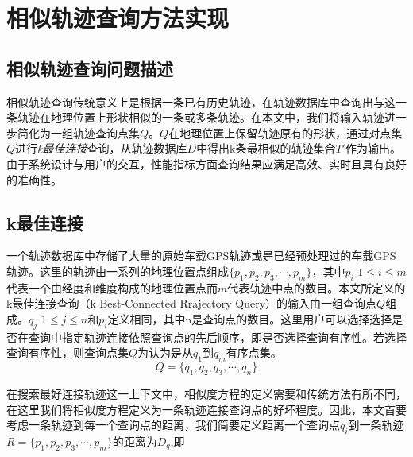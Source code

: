

\theoremstyle{definition}
\newtheorem{definition}{定义}[section]

\chapter{相似轨迹查询方法实现}
\label{chap:implementation}

\section{相似轨迹查询问题描述}
\label{sec:question describe}
相似轨迹查询传统意义上是根据一条已有历史轨迹，在轨迹数据库中查询出与这一条轨迹在地理位置上形状相似的一条或多条轨迹。在本文中，我们将输入轨迹进一步简化为一组轨迹查询点集$Q$。$Q$在地理位置上保留轨迹原有的形状，通过对点集$Q$进行\emph{k最佳连接}查询，从轨迹数据库$D$中得出k条最相似的轨迹集合$T'$作为输出。由于系统设计与用户的交互，性能指标方面查询结果应满足高效、实时且具有良好的准确性。

\section{k最佳连接}
\label{sec:k-bct}
一个轨迹数据库中存储了大量的原始车载GPS轨迹或是已经预处理过的车载GPS轨迹。这里的轨迹由一系列的地理位置点组成$\{p_{1},p_{2},p_{3},\cdots, p_{m}\}$，其中$p_{i}$ $1\leq i \leq m$代表一个由经度和维度构成的地理位置点而$m$代表轨迹中点的数目。本文所定义的k最佳连接查询（k Best-Connected Rrajectory Query）的输入由一组查询点$Q$组成。$q_{j}$ $1 \leq j \leq n$和$p_{i}$定义相同，其中n是查询点的数目。这里用户可以选择选择是否在查询中指定轨迹连接依照查询点的先后顺序，即是否选择查询有序性。若选择查询有序性，则查询点集$Q$为认为是从$q_{1}$到$q_{m}$有序点集。
\begin{displaymath}
	Q = \{q_{1},q_{2},q_{3},\cdots, q_{n}\}
\end{displaymath}

在搜索最好连接轨迹这一上下文中，相似度方程的定义需要和传统方法有所不同，在这里我们将相似度方程定义为一条轨迹连接查询点的好坏程度。因此，本文首要考虑一条轨迹到每一个查询点的距离，我们简要定义距离一个查询点$q_{i}$到一条轨迹$R=\{p_{1},p_{2},p_{3},\cdots, p_{m}\}$的距离为$D_{q}$,即

